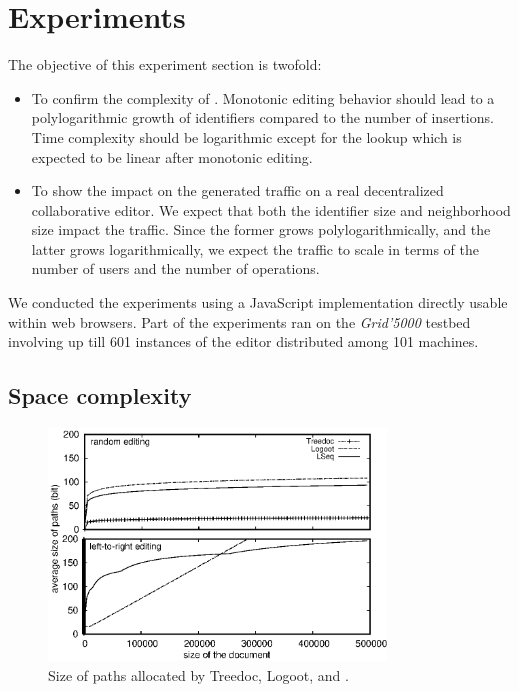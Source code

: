 \section{Experiments}
\label{sec:experiments}

The objective of this experiment section is twofold:
\begin{itemize}[noitemsep, leftmargin=*]
\item To confirm the complexity of \LSEQ. Monotonic editing behavior should lead
  to a polylogarithmic growth of identifiers compared to the number of
  insertions. Time complexity should be logarithmic except for the lookup which
  is expected to be linear after monotonic editing.
\item To show the impact on the generated traffic on a real decentralized
  collaborative editor. We expect that both the identifier size and neighborhood
  size impact the traffic. Since the former grows polylogarithmically, and the
  latter grows logarithmically, we expect the traffic to scale in terms of
  the number of users and the number of operations.
\end{itemize}

We conducted the experiments using a JavaScript implementation directly usable
within web browsers. Part of the experiments ran on the \emph{Grid'5000} testbed
involving up till 601 instances of the editor distributed among 101 machines.

\subsection{Space complexity}

\begin{figure}
  \centering
  \includegraphics[width=0.8\textwidth]{./img/space.eps}
  \caption{\label{fig:space}Size of paths allocated by Treedoc, Logoot, and
    \LSEQ.}
\end{figure}

